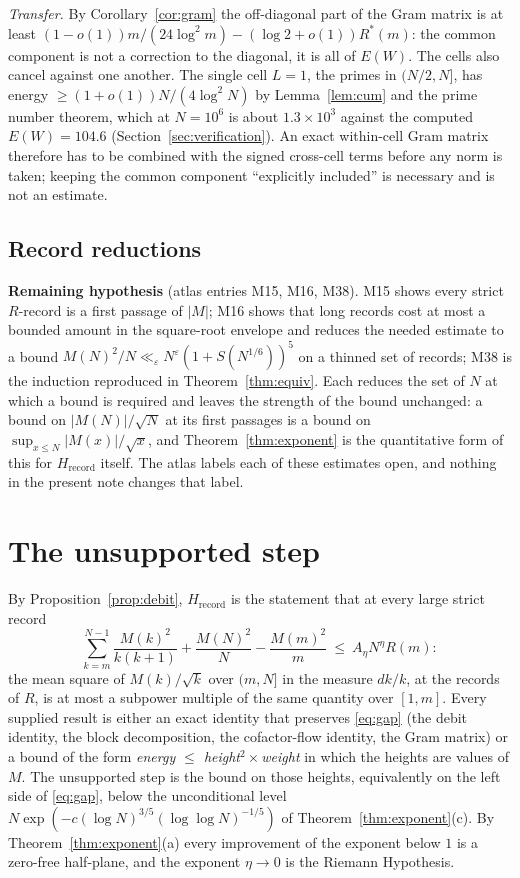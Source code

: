 \documentclass[11pt]{article}
\theoremstyle{definition}
\theoremstyle{remark}
\newcommand{\Hrec}{H_{\mathrm{record}}}
\newcommand{\Rstar}{R^{*}}
\begin{document}
\emph{Transfer.} By Corollary~\ref{cor:gram} the off-diagonal part of the Gram matrix is at least $(1-o(1))m/(24\log^2m)-(\log2+o(1))\Rstar(m)$: the common component is not a correction to the diagonal, it is all of $E(W)$. The cells also cancel against one another. The single cell $L=1$, the primes in $(N/2,N]$, has energy $\ge(1+o(1))N/(4\log^2N)$ by Lemma~\ref{lem:cum} and the prime number theorem, which at $N=10^6$ is about $1.3\times10^3$ against the computed $E(W)=104.6$ (Section~\ref{sec:verification}). An exact within-cell Gram matrix therefore has to be combined with the signed cross-cell terms before any norm is taken; keeping the common component ``explicitly included'' is necessary and is not an estimate.

\subsection{Record reductions}

\textbf{Remaining hypothesis} (atlas entries M15, M16, M38). M15 shows every strict $R$-record is a first passage of $|M|$; M16 shows that long records cost at most a bounded amount in the square-root envelope and reduces the needed estimate to a bound $M(N)^2/N\ll_\varepsilon N^\varepsilon(1+S(N^{1/6}))^5$ on a thinned set of records; M38 is the induction reproduced in Theorem~\ref{thm:equiv}. Each reduces the set of $N$ at which a bound is required and leaves the strength of the bound unchanged: a bound on $|M(N)|/\sqrt N$ at its first passages is a bound on $\sup_{x\le N}|M(x)|/\sqrt x$, and Theorem~\ref{thm:exponent} is the quantitative form of this for $\Hrec$ itself. The atlas labels each of these estimates open, and nothing in the present note changes that label.

\section{The unsupported step}\label{sec:gap}

By Proposition~\ref{prop:debit}, $\Hrec$ is the statement that at every large strict record
\begin{equation}\label{eq:gap}
\sum_{k=m}^{N-1}\frac{M(k)^2}{k(k+1)}+\frac{M(N)^2}N-\frac{M(m)^2}m\ \le\ A_\eta N^\eta R(m):
\end{equation}
the mean square of $M(k)/\sqrt k$ over $(m,N]$ in the measure $dk/k$, at the records of $R$, is at most a subpower multiple of the same quantity over $[1,m]$. Every supplied result is either an exact identity that preserves \eqref{eq:gap} (the debit identity, the block decomposition, the cofactor-flow identity, the Gram matrix) or a bound of the form \emph{energy $\le$ height$^2\times$weight} in which the heights are values of $M$. The unsupported step is the bound on those heights, equivalently on the left side of \eqref{eq:gap}, below the unconditional level $N\exp(-c(\log N)^{3/5}(\log\log N)^{-1/5})$ of Theorem~\ref{thm:exponent}(c). By Theorem~\ref{thm:exponent}(a) every improvement of the exponent below $1$ is a zero-free half-plane, and the exponent $\eta\to0$ is the Riemann Hypothesis.
\end{document}
